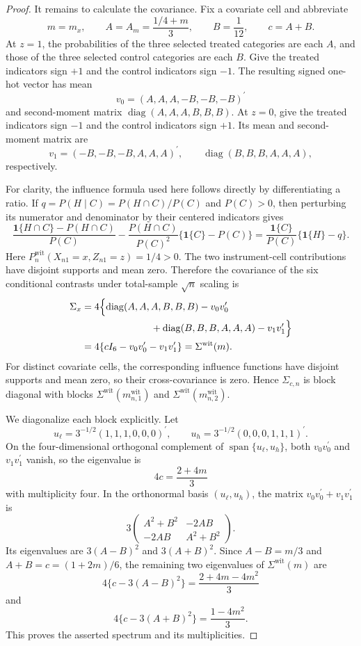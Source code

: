 \documentclass{article}
\begin{document}
\begin{proof}
It remains to calculate the covariance. Fix a covariate cell and abbreviate
\[
m=m_x,
\qquad
A=A_m=\frac{1/4+m}{3},
\qquad
B=\frac1{12},
\qquad
c=A+B.
\]
At \(z=1\), the probabilities of the three selected treated categories are each \(A\), and those of the three selected control categories are each \(B\). Give the treated indicators sign \(+1\) and the control indicators sign \(-1\). The resulting signed one-hot vector has mean
\[
v_0=(A,A,A,-B,-B,-B)^{\prime}
\]
and second-moment matrix \(\operatorname{diag}(A,A,A,B,B,B)\). At \(z=0\), give the treated indicators sign \(-1\) and the control indicators sign \(+1\). Its mean and second-moment matrix are
\[
v_1=(-B,-B,-B,A,A,A)^{\prime},
\qquad
\operatorname{diag}(B,B,B,A,A,A),
\]
respectively.

For clarity, the influence formula used here follows directly by differentiating a ratio. If \(q=P(H\mid C)=P(H\cap C)/P(C)\) and \(P(C)>0\), then perturbing its numerator and denominator by their centered indicators gives
\[
\frac{\mathbf 1\{H\cap C\}-P(H\cap C)}{P(C)}
-\frac{P(H\cap C)}{P(C)^2}\{\mathbf 1\{C\}-P(C)\}
=\frac{\mathbf 1\{C\}}{P(C)}\{\mathbf 1\{H\}-q\}.
\]
Here \(P_n^{\mathrm{wit}}(X_{n1}=x,Z_{n1}=z)=1/4>0\). The two instrument-cell contributions have disjoint supports and mean zero. Therefore the covariance of the six conditional contrasts under total-sample \(\sqrt n\) scaling is
\[
\begin{aligned}
\Sigma_x
&=4\Bigl\{\operatorname{diag}(A,A,A,B,B,B)-v_0v_0^{\prime}\\
&\hspace{25mm}+\operatorname{diag}(B,B,B,A,A,A)-v_1v_1^{\prime}\Bigr\}\\
&=4\{cI_6-v_0v_0^{\prime}-v_1v_1^{\prime}\}
=\Sigma^{\mathrm{wit}}(m).
\end{aligned}
\]
For distinct covariate cells, the corresponding influence functions have disjoint supports and mean zero, so their cross-covariance is zero. Hence \(\Sigma_{c,n}\) is block diagonal with blocks \(\Sigma^{\mathrm{wit}}(m^{\mathrm{wit}}_{n,1})\) and \(\Sigma^{\mathrm{wit}}(m^{\mathrm{wit}}_{n,2})\).

We diagonalize each block explicitly. Let
\[
u_\ell=3^{-1/2}(1,1,1,0,0,0)^{\prime},
\qquad
u_h=3^{-1/2}(0,0,0,1,1,1)^{\prime}.
\]
On the four-dimensional orthogonal complement of \(\operatorname{span}\{u_\ell,u_h\}\), both \(v_0v_0^{\prime}\) and \(v_1v_1^{\prime}\) vanish, so the eigenvalue is
\[
4c=\frac{2+4m}{3}
\]
with multiplicity four. In the orthonormal basis \((u_\ell,u_h)\), the matrix \(v_0v_0^{\prime}+v_1v_1^{\prime}\) is
\[
3\begin{pmatrix}
A^2+B^2&-2AB\\
-2AB&A^2+B^2
\end{pmatrix}.
\]
Its eigenvalues are \(3(A-B)^2\) and \(3(A+B)^2\). Since \(A-B=m/3\) and \(A+B=c=(1+2m)/6\), the remaining two eigenvalues of \(\Sigma^{\mathrm{wit}}(m)\) are
\[
4\{c-3(A-B)^2\}=\frac{2+4m-4m^2}{3}
\]
and
\[
4\{c-3(A+B)^2\}=\frac{1-4m^2}{3}.
\]
This proves the asserted spectrum and its multiplicities.


\end{proof}
\end{document}
